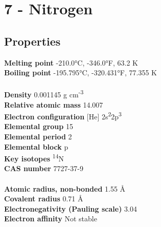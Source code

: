 \section{7 - Nitrogen}
\label{sec:elem-nitrogen}
\subsection{Properties}
\textbf{Melting point} -210.0°C, -346.0°F, 63.2 K\\
\textbf{Boiling point} -195.795°C, -320.431°F, 77.355 K\\
\\
\textbf{Density} 0.001145 g cm\textsuperscript{-3}\\
\textbf{Relative atomic mass} 14.007\\
\textbf{Electron configuration} [He] 2s\textsuperscript{2}2p\textsuperscript{3} \\
\textbf{Elemental group} 15\\
\textbf{Elemental period} 2\\
\textbf{Elemental block} p\\
\textbf{Key isotopes} \textsuperscript{14}N\\
\textbf{CAS number} 7727-37-9\\
\\
\textbf{Atomic radius, non-bonded} 1.55 Å\\
\textbf{Covalent radius} 0.71 Å\\
\textbf{Electronegativity (Pauling scale)} 3.04\\
\textbf{Electron affinity} Not stable\\